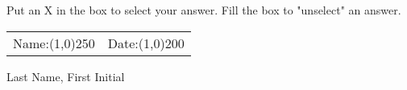 \documentclass[english,pagemark,stamp,final,letterpaper,no_print_survey_id,style=classic]{gradetest}
\begin{document}
\selectfont
\title{  }
\begin{center}
		\checkedbox \quad Put an X in the box to select your answer.
		\quad \correctedbox  \quad Fill the box to "unselect" an answer. \\
\vspace{10pt}
\begin{tabularx}{\textwidth}{ll}
	Name:{\line(1,0){250}} & Date:\line(1,0){200} 
\end{tabularx}
\end{center}
\begin{questionnaire}[noinfo]
\setlength{\checkboxsize}{3mm}
	\begin{multicols*}{3}

		\def \groupwidth {30mm}
		\setlength{\tabcolsep}{0pt}
		\begin{choicegroup}{Last Name, First Initial}
			\groupaddchoice{\huge$\_$}
			\groupaddchoice{\huge$\_$}
			\groupaddchoice{\huge$\_$}
			\groupaddchoice{\huge$\_$}
			\groupaddchoice{\huge$\_$}
			\def\spaceafterhead{\vspace{2mm}}
			

\end{choicegroup}
\end{multicols*}
\end{questionnaire}
\end{document}
